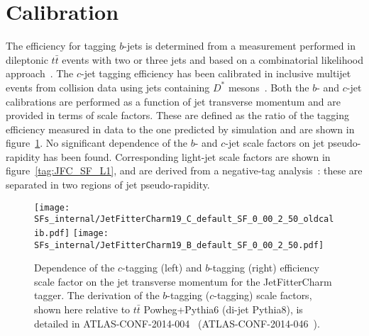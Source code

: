 

\clearpage
\section{Calibration}
\label{tag:sec:calib}
The efficiency for tagging $b$-jets is determined from a measurement performed in dileptonic $t\bar{t}$ events with two or three jets and based on a combinatorial likelihood approach~\cite{Giacinto}. The $c$-jet tagging efficiency has been calibrated in inclusive multijet events from collision data using jets  containing $D^*$ mesons~\cite{bc2014}. Both the $b$- and $c$-jet calibrations are performed as a function of jet transverse momentum and are provided in terms of scale factors. These are defined as the ratio of the tagging efficiency measured in data to the one predicted by simulation and are shown in figure~\ref{tag:JFC_SF_B}.  No significant dependence of the $b$- and $c$-jet scale factors on jet pseudo-rapidity has been found. Corresponding light-jet scale factors are shown in figure~\ref{tag:JFC_SF_L1}, and are derived from a negative-tag analysis~\cite{bc2014}: these are separated in two regions of jet pseudo-rapidity.

\newcommand{\lSF}{as detailed in ATLAS-CONF-2014-046~\cite{bc2014}. The scale factors are measured relative to di-jet Pythia8+EvtGen.} %
\newcommand{\cSF}{as detailed in ATLAS-CONF-2014-046~\cite{bc2014}. The scale factors are measured relative to di-jet Pythia8.} %
\newcommand{\bSF}{as detailed in ATLAS-CONF-2014-004~\cite{Giacinto}. The scale factors are measured relative to $t \bar{t}$ Powheg+Pythia6.} %

\begin{figure}[!h]
  \centering
  \texttt{[image: SFs\_internal/JetFitterCharm19\_C\_default\_SF\_0\_00\_2\_50\_oldcalib.pdf]}
  \texttt{[image: SFs\_internal/JetFitterCharm19\_B\_default\_SF\_0\_00\_2\_50.pdf]}
  \caption{Dependence of the $c$-tagging (left) and $b$-tagging (right) efficiency scale factor on the jet transverse momentum for the JetFitterCharm tagger. The derivation of the $b$-tagging ($c$-tagging) scale factors, shown here relative to $t \bar{t}$ Powheg+Pythia6 (di-jet Pythia8), is detailed in ATLAS-CONF-2014-004~\cite{Giacinto} (ATLAS-CONF-2014-046~\cite{bc2014}).}
  \label{tag:JFC_SF_B}
\end{figure}

